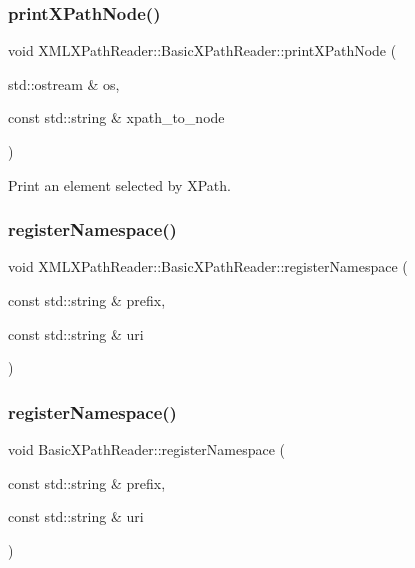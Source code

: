 \subsubsection{\texorpdfstring{printXPathNode()}{printXPathNode()}\hspace{0.1cm}{\footnotesize\ttfamily [3/3]}}
{\footnotesize\ttfamily void X\+M\+L\+X\+Path\+Reader\+::\+Basic\+X\+Path\+Reader\+::print\+X\+Path\+Node (\begin{DoxyParamCaption}\item[{std\+::ostream \&}]{os,  }\item[{const std\+::string \&}]{xpath\+\_\+to\+\_\+node }\end{DoxyParamCaption})}



Print an element selected by X\+Path. 

\mbox{\label{classXMLXPathReader_1_1BasicXPathReader_a5991605f4cda926b146829be5798b037}} 
\subsubsection{\texorpdfstring{registerNamespace()}{registerNamespace()}\hspace{0.1cm}{\footnotesize\ttfamily [1/3]}}
{\footnotesize\ttfamily void X\+M\+L\+X\+Path\+Reader\+::\+Basic\+X\+Path\+Reader\+::register\+Namespace (\begin{DoxyParamCaption}\item[{const std\+::string \&}]{prefix,  }\item[{const std\+::string \&}]{uri }\end{DoxyParamCaption})}

\mbox{\label{classXMLXPathReader_1_1BasicXPathReader_a6c6d6e977694344a70506a24bebe853d}} 
\subsubsection{\texorpdfstring{registerNamespace()}{registerNamespace()}\hspace{0.1cm}{\footnotesize\ttfamily [2/3]}}
{\footnotesize\ttfamily void Basic\+X\+Path\+Reader\+::register\+Namespace (\begin{DoxyParamCaption}\item[{const std\+::string \&}]{prefix,  }\item[{const std\+::string \&}]{uri }\end{DoxyParamCaption})}

